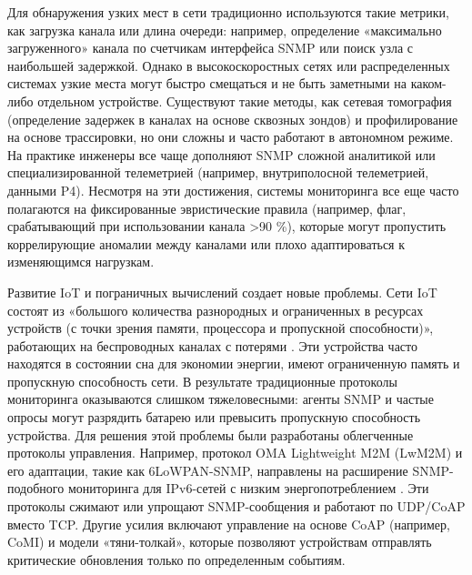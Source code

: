 Для обнаружения узких мест в сети традиционно используются такие метрики, как загрузка канала или длина очереди: например, определение «максимально загруженного» канала по счетчикам интерфейса SNMP или поиск узла с наибольшей задержкой. Однако в высокоскоростных сетях или распределенных системах узкие места могут быстро смещаться и не быть заметными на каком-либо отдельном устройстве. Существуют такие методы, как сетевая томография (определение задержек в каналах на основе сквозных зондов) и профилирование на основе трассировки, но они сложны и часто работают в автономном режиме. На практике инженеры все чаще дополняют SNMP сложной аналитикой или специализированной телеметрией (например, внутриполосной телеметрией, данными P4). Несмотря на эти достижения, системы мониторинга все еще часто полагаются на фиксированные эвристические правила (например, флаг, срабатывающий при использовании канала >90 \%), которые могут пропустить коррелирующие аномалии между каналами или плохо адаптироваться к изменяющимся нагрузкам.

Развитие IoT и пограничных вычислений создает новые проблемы. Сети IoT состоят из «большого количества разнородных и ограниченных в ресурсах устройств (с точки зрения памяти, процессора и пропускной способности)», работающих на беспроводных каналах с потерями \cite{Aboubakar2022}. Эти устройства часто находятся в состоянии сна для экономии энергии, имеют ограниченную память и пропускную способность сети. В результате традиционные протоколы мониторинга оказываются слишком тяжеловесными: агенты SNMP и частые опросы могут разрядить батарею или превысить пропускную способность устройства. Для решения этой проблемы были разработаны облегченные протоколы управления. Например, протокол OMA Lightweight M2M (LwM2M) и его адаптации, такие как 6LoWPAN-SNMP, направлены на расширение SNMP-подобного мониторинга для IPv6-сетей с низким энергопотреблением \cite{Aboubakar2022}. Эти протоколы сжимают или упрощают SNMP-сообщения и работают по UDP/CoAP вместо TCP. Другие усилия включают управление на основе CoAP (например, CoMI) и модели «тяни-толкай», которые позволяют устройствам отправлять критические обновления только по определенным событиям.

